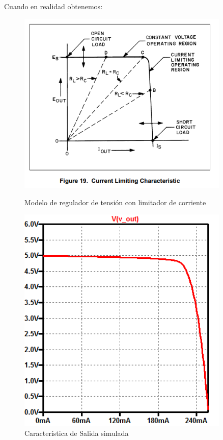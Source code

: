 Cuando en realidad obtenemos:
\begin{figure}[H]
	\centering
	\begin{minipage}{0.45\textwidth}
		\centering
		\includegraphics[width=0.9\textwidth]{ImagenesEjercicio1/CVCL.PNG} %
		\caption{Modelo de regulador de tensión con limitador de corriente}
	\end{minipage}\hfill
	\begin{minipage}{0.45\textwidth}
		\centering
		\includegraphics[width=0.9\textwidth]{ImagenesEjercicio1/CaracteristicaDeSalidaConGrillaFL2.png} %
		\caption{Característica de Salida simulada}
	\end{minipage}
\end{figure}


